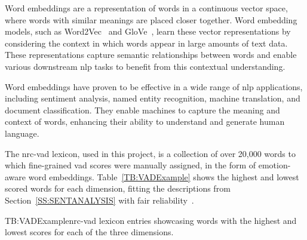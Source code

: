 Word embeddings are a representation of words in a continuous vector space, where words with similar meanings are placed closer together. Word embedding models, such as Word2Vec~\cite{WORD2VEC} and GloVe~\cite{GLOVE}, learn these vector representations by considering the context in which words appear in large amounts of text data. These representations capture semantic relationships between words and enable various downstream \acs{nlp} tasks to benefit from this contextual understanding.

Word embeddings have proven to be effective in a wide range of \acs{nlp} applications, including sentiment analysis, named entity recognition, machine translation, and document classification. They enable machines to capture the meaning and context of words, enhancing their ability to understand and generate human language.

The \acs{nrc}-\acs{vad} lexicon, used in this project, is a collection of over 20,000 words to which fine-grained \acs{vad} scores were manually assigned, in the form of emotion-aware word embeddings. Table~\ref{TB:VADExample} shows the highest and lowest scored words for each dimension, fitting the descriptions from Section~\ref{SS:SENTANALYSIS} with fair reliability~\cite{BOOK:NRC}.
\vspace{0.4em}
\begin{table}[NRC-VAD lexicon example entries]{TB:VADExample}{\acs{nrc}-\acs{vad} lexicon entries showcasing words with the highest and lowest scores for each of the three dimensions.}
    \renewcommand{\arraystretch}{0.91}
\end{table}